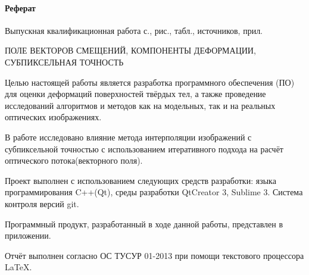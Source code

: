\newpage
{}
\paragraph{\hfill Реферат \hfill}
Выпускная квалификационная работа  с.,  рис.,  табл.,  источников,  прил.


ПОЛЕ ВЕКТОРОВ СМЕЩЕНИЙ, КОМПОНЕНТЫ ДЕФОРМАЦИИ, СУБПИКСЕЛЬНАЯ ТОЧНОСТЬ

Целью настоящей работы является разработка программного обеспечения (ПО) для оценки деформаций поверхностей твёрдых тел, а также проведение исследований алгоритмов и методов как на модельных, так и на реальных оптических изображениях.

В работе исследовано влияние метода интерполяции изображений с субпиксельной точностью с использованием итеративного подхода на расчёт оптического потока(векторного поля).

Проект выполнен с использованием следующих средств разработки: языка программирования C++(Qt), среды разработки QtCreator 3, Sublime 3. Система контроля версий git.

Программный продукт, разработанный в ходе данной работы, представлен в приложении.

Отчёт выполнен согласно ОС ТУСУР 01-2013 при помощи текстового процессора \LaTeX.